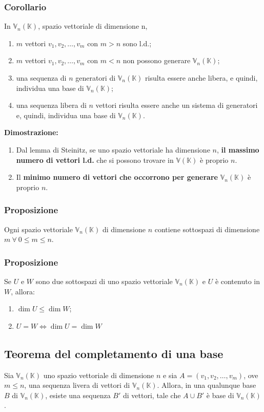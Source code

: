 \documentclass{article}
\newcommand{\V}{\mathbb{V} (\mathbb{K})}
\newcommand{\s}[2]{#1_1, #1_2, \ldots, #1_{#2}}
\newcommand{\Vx}[1]{\mathbb{V}_#1 (\mathbb{K})}
\begin{document}
\subsubsection{Corollario}
In $\Vx{n}$, spazio vettoriale di dimensione n,
\begin{enumerate}
    \item $m$ vettori $\s{v}{m}$ con $m > n$ sono l.d.;
    \item $m$ vettori $\s{v}{m}$ con $m < n$ non possono generare $\Vx{n}$;
    \item una sequenza di $n$ generatori di $\Vx{n}$ risulta essere anche libera, e
          quindi, individua una base di $\Vx{n}$;
    \item una sequenza libera di $n$ vettori risulta essere anche un sistema di
          generatori e, quindi, individua una base di $\Vx{n}$.
\end{enumerate}
\textbf{Dimostrazione:}
\begin{enumerate}
    \item Dal lemma di Steinitz, se uno spazio vettoriale ha dimensione $n$, \textbf{il
              massimo numero di vettori l.d.} che si possono trovare in $\V$ è proprio $n$.
    \item Il \textbf{minimo numero di vettori che occorrono per generare} $\Vx{n}$ è
          proprio $n$.
\end{enumerate}

\subsubsection{Proposizione}
Ogni spazio vettoriale $\Vx{n}$ di dimensione $n$ contiene sottospazi di
dimensione $m \ \forall \ 0\leq m\leq n$.

\subsubsection{Proposizione}
Se $U$ e $W$ sono due sottospazi di uno spazio vettoriale $\Vx{n}$ e $U$ è
contenuto in $W$, allora:
\begin{enumerate}
    \item $\dim U\leq\dim W$;
    \item $U = W \iff \dim U = \dim W$
\end{enumerate}

\subsection{Teorema del completamento di una base}
Sia $\Vx{n}$ uno spazio vettoriale di dimensione $n$ e sia $A = (\s{v}{m})$,
ove $m\leq n$, una sequenza livera di vettori di $\Vx{n}$. Allora, in una
qualunque base $B$ di $\Vx{n}$, esiste una sequenza $B'$ di vettori, tale che
$A\cup B'$ è base di $\Vx{n}$.
\end{document}
